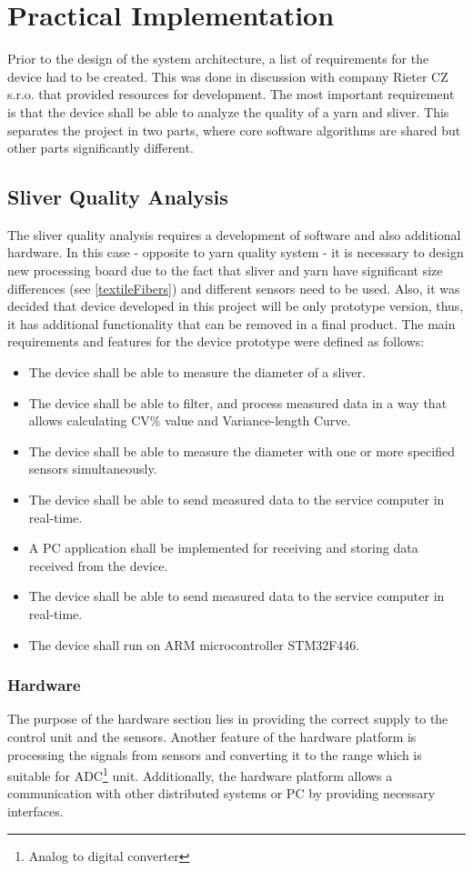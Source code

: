 \documentclass[twoside]{ctuthesis}
\theoremstyle{plain}
\theoremstyle{definition}
\theoremstyle{note}
\begin{document}
\chapter{Practical Implementation}
Prior to the design of the system architecture, a list of requirements for the device had to be created. This was done in discussion with company Rieter CZ s.r.o. that provided resources for development. The most important requirement is that the device shall be able to analyze the quality of a yarn and sliver. This separates the project in two parts, where core software algorithms are shared but other parts significantly different. 

\section{Sliver Quality Analysis}
The sliver quality analysis requires a development of software and also additional hardware. In this case - opposite to yarn quality system - it is necessary to design new processing board due to the fact that sliver and yarn have significant size differences (see \ref{textileFibers}) and different sensors need to be used. Also, it was decided that device developed in this project will be only prototype version, thus, it has additional functionality that can be removed in a final product. The main requirements and features for the device prototype were defined as follows:
\begin{itemize}
	\setlength{\itemsep}{5pt}
	\item The device shall be able to measure the diameter of a sliver.
	\item The device shall be able to filter, and process measured data in a way that allows calculating CV\% value and Variance-length Curve.
	\item The device shall be able to measure the diameter with one or more specified sensors simultaneously.
	\item The device shall be able to send measured data to the service computer in real-time.
	\item A PC application shall be implemented for receiving and storing data received from the device.
	\item The device shall be able to send measured data to the service computer in real-time.
	\item The device shall run on ARM microcontroller STM32F446.
\end{itemize}
\subsection{Hardware}
The purpose of the hardware section lies in providing the correct supply to the control unit and the sensors. Another feature of the hardware platform is processing the signals from sensors and converting it to the range which is suitable for ADC\footnote{Analog to digital converter} unit. Additionally, the hardware platform allows a communication with other distributed systems or PC by providing necessary interfaces. 
\end{document}
